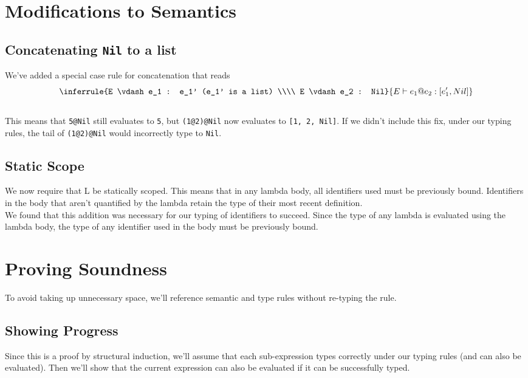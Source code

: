 \documentclass[12pt]{article}
\begin{document}
\section{Modifications to Semantics}

\subsection{Concatenating \texttt{Nil} to a list}

We've added a special case rule for concatenation that reads
\[
\inferrule{E \vdash e_1 : e_1' (e_1' is a list) \\\\ E \vdash e_2 : Nil}{E \vdash e_1@e_2 : [e_1', Nil]}
\]
\\
This means that \texttt{5@Nil} still evaluates to \texttt{5}, but \texttt{(1@2)@Nil} now evaluates to \texttt{[1, 2, Nil]}. If we didn't include this fix, under our typing rules, the tail of \texttt{(1@2)@Nil} would incorrectly type to \texttt{Nil}.

\subsection{Static Scope}
We now require that L be statically scoped. This means that in any lambda body, all identifiers used must be previously bound. Identifiers in the body that aren't quantified by the lambda retain the type of their most recent definition.\\
We found that this addition was necessary for our typing of identifiers to succeed. Since the type of any lambda is evaluated using the lambda body, the type of any identifier used in the body must be previously bound.
\\

\section{Proving Soundness}

To avoid taking up unnecessary space, we'll reference semantic and type rules without re-typing the rule.

\subsection{Showing Progress}
Since this is a proof by structural induction, we'll assume that each sub-expression types correctly under our typing rules (and can also be evaluated). Then we'll show that the current expression can also be evaluated if it can be successfully typed.
\end{document}

